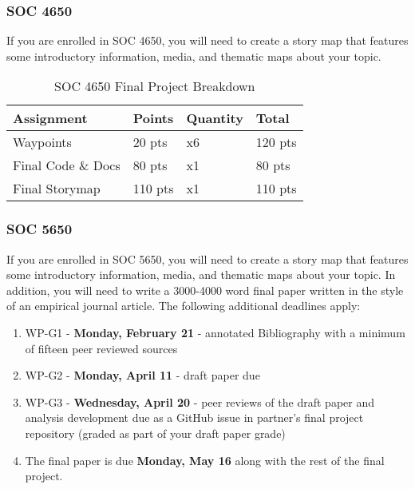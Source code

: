 \documentclass[
]{book}
\providecommand{\tightlist}{%
  \setlength{\itemsep}{0pt}\setlength{\parskip}{0pt}}
\begin{document}
\hypertarget{soc-4650}{%
\subsubsection{SOC 4650}\label{soc-4650}}

If you are enrolled in SOC 4650, you will need to create a story map that features some introductory information, media, and thematic maps about your topic.

\begin{table}

\caption{\label{tab:unnamed-chunk-5}SOC 4650 Final Project Breakdown}
\centering
\begin{tabular}[t]{llll}
\toprule
Assignment & Points & Quantity & Total\\
\midrule
Waypoints & 20 pts & x6 & 120 pts\\
Final Code \& Docs & 80 pts & x1 & 80 pts\\
Final Storymap & 110 pts & x1 & 110 pts\\
\bottomrule
\end{tabular}
\end{table}

\hypertarget{soc-5650}{%
\subsubsection{SOC 5650}\label{soc-5650}}

If you are enrolled in SOC 5650, you will need to create a story map that features some introductory information, media, and thematic maps about your topic. In addition, you will need to write a 3000-4000 word final paper written in the style of an empirical journal article. The following additional deadlines apply:

\begin{enumerate}
\def\labelenumi{\arabic{enumi}.}
\tightlist
\item
  WP-G1 - \textbf{Monday, February 21} - annotated Bibliography with a minimum of fifteen peer reviewed sources
\item
  WP-G2 - \textbf{Monday, April 11} - draft paper due
\item
  WP-G3 - \textbf{Wednesday, April 20} - peer reviews of the draft paper and analysis development due as a GitHub issue in partner's final project repository (graded as part of your draft paper grade)
\item
  The final paper is due \textbf{Monday, May 16} along with the rest of the final project.
\end{enumerate}
\end{document}
